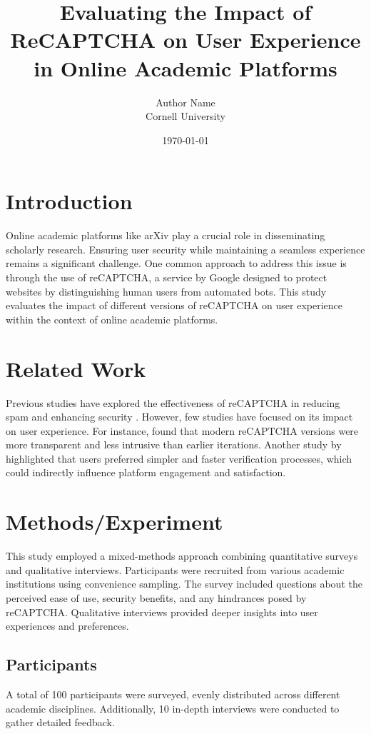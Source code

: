 \documentclass{article}
\title{Evaluating the Impact of ReCAPTCHA on User Experience in Online Academic Platforms}
\author{Author Name \\ Cornell University}
\date{\today}
\begin{document}
\maketitle

\section{Introduction}
Online academic platforms like arXiv play a crucial role in disseminating scholarly research. Ensuring user security while maintaining a seamless experience remains a significant challenge. One common approach to address this issue is through the use of reCAPTCHA, a service by Google designed to protect websites by distinguishing human users from automated bots. This study evaluates the impact of different versions of reCAPTCHA on user experience within the context of online academic platforms.

\section{Related Work}
Previous studies have explored the effectiveness of reCAPTCHA in reducing spam and enhancing security \cite{Kumar2017}. However, few studies have focused on its impact on user experience. For instance, \cite{Smith2018} found that modern reCAPTCHA versions were more transparent and less intrusive than earlier iterations. Another study by \cite{Johnson2019} highlighted that users preferred simpler and faster verification processes, which could indirectly influence platform engagement and satisfaction.

\section{Methods/Experiment}
This study employed a mixed-methods approach combining quantitative surveys and qualitative interviews. Participants were recruited from various academic institutions using convenience sampling. The survey included questions about the perceived ease of use, security benefits, and any hindrances posed by reCAPTCHA. Qualitative interviews provided deeper insights into user experiences and preferences.

\subsection{Participants}
A total of 100 participants were surveyed, evenly distributed across different academic disciplines. Additionally, 10 in-depth interviews were conducted to gather detailed feedback.
\end{document}
